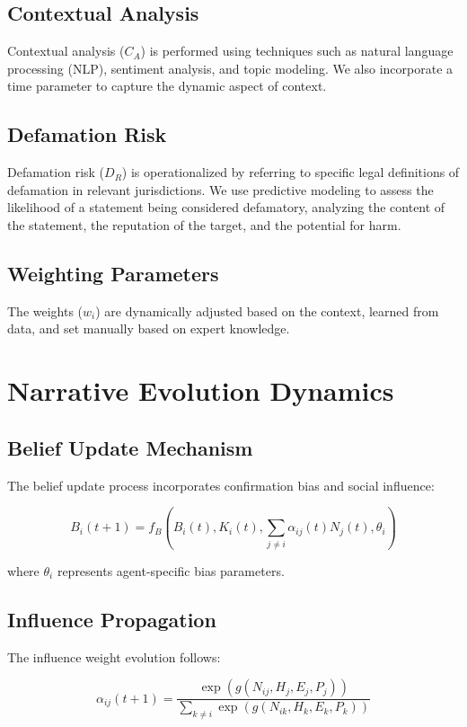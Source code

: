 \documentclass[12pt, a4paper]{article}
\begin{document}
\subsection{Contextual Analysis}
Contextual analysis ($C_A$) is performed using techniques such as natural language processing (NLP), sentiment analysis, and topic modeling. We also incorporate a time parameter to capture the dynamic aspect of context.

\subsection{Defamation Risk}
Defamation risk ($D_R$) is operationalized by referring to specific legal definitions of defamation in relevant jurisdictions. We use predictive modeling to assess the likelihood of a statement being considered defamatory, analyzing the content of the statement, the reputation of the target, and the potential for harm.

\subsection{Weighting Parameters}
The weights ($w_i$) are dynamically adjusted based on the context, learned from data, and set manually based on expert knowledge.

\section{Narrative Evolution Dynamics}
\subsection{Belief Update Mechanism}
The belief update process incorporates confirmation bias and social influence:

\begin{equation}
B_i(t+1) = f_B(B_i(t), K_i(t), \sum_{j \neq i} \alpha_{ij}(t)N_j(t), \theta_i)
\end{equation}

where $\theta_i$ represents agent-specific bias parameters.

\subsection{Influence Propagation}
The influence weight evolution follows:

\begin{equation}
\alpha_{ij}(t+1) = \frac{\exp(g(N_{ij}, H_j, E_j, P_j))}{\sum_{k \neq i} \exp(g(N_{ik}, H_k, E_k, P_k))}
\end{equation}
\end{document}
